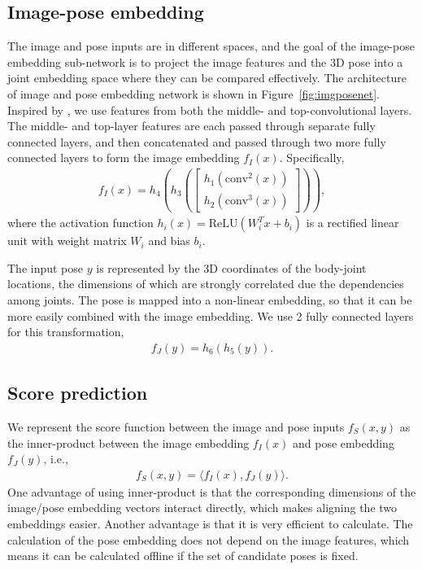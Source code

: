 \documentclass[10pt,twocolumn,letterpaper]{article}
\newcommand{\conv}{\mathrm{conv}}
\newcommand{\ReLU}{\mathrm{ReLU}}
\begin{document}
\subsection{Image-pose embedding}
\label{sub:imagepose}
\vspace{-0.05in}
The image and pose inputs are in different spaces, and
the goal of the image-pose embedding sub-network is to project the image features and the 3D pose into a joint embedding space where they can be compared effectively.
The architecture of image and pose embedding network is shown in Figure~\ref{fig:imgposenet}. 
Inspired by \cite{Sun2014dlface,hmlpeijcv}, we use features from both the middle- and top-convolutional layers.
The middle- and top-layer features are each passed through separate fully connected layers, and then concatenated and passed through two more fully connected layers to form the image embedding $f_{I}(x)$.
Specifically,
\begin{align} 
f_{I}(x) = h_4 ( h_3 ( \begin{bmatrix} h_1(\conv^{2}(x)) \\ h_2(\conv^{3}(x)) \end{bmatrix})),
\label{equ:imgfeature}
\end{align} 
where the activation function $h_i(x) = \ReLU( W_i^T x + b_i)$ is a rectified linear unit with  weight matrix $W_i$ and bias $b_i$.

The input pose $y$ is represented by the 3D coordinates of the body-joint locations, 
the dimensions of which are strongly correlated due the dependencies among joints. 
The pose is mapped into a non-linear embedding, so that it can be more easily combined with the image embedding.
We use 2 fully connected layers for this transformation,
\begin{align}
f_{J}(y) = h_6( h_5(y)).
\end{align}


 
 
\subsection{Score prediction}
We represent the score function between the image and pose inputs $f_{S}(x,y)$ as the inner-product between the image embedding $f_{I}(x)$ and pose embedding $f_{J}(y)$, i.e., 
\begin{align}
f_{S}(x,y)  = \langle f_{I}(x), f_{J}(y) \rangle.
\end{align} 
One advantage of using inner-product is that the corresponding dimensions of the image/pose embedding vectors interact directly, which makes aligning the two embeddings easier.
Another advantage %
is that it is very efficient to calculate.
The calculation of the pose embedding does not depend on the image features, which means it can be calculated offline if the set of candidate poses is fixed. 
\end{document}
